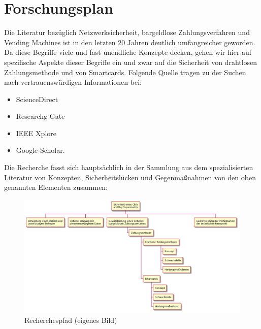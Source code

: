 \section{Forschungsplan}

Die Literatur bezüglich Netzwerksicherheit, bargeldlose Zahlungsverfahren und Vending Machines ist 
in den letzten 20 Jahren deutlich umfangreicher geworden. Da diese Begriffe viele und fast unendliche 
Konzepte decken, gehen wir hier auf spezifische Aspekte dieser Begriffe ein und zwar 
auf die Sicherheit von drahtlosen Zahlungsmethode und von Smartcards. Folgende Quelle tragen zu der
Suchen nach vertrauenswürdigen Informationen bei:

\begin{itemize}
    \item ScienceDirect
    \item Researchg Gate
    \item IEEE Xplore
    \item Google Scholar.
\end{itemize}

Die Recherche fasst sich hauptsächlich in der Sammlung aus dem spezialisierten Literatur von Konzepten,
Sicherheitslücken und Gegenmaßnahmen von den oben genannten Elementen zusammen:

\newpage
\setcounter{page}{19}
\begin{landscape}
    \begin{figure}[htb]
        \includegraphics[width=25cm]{Bilder/Diagram2.png}
        \caption{Recherchespfad (eigenes Bild)}
        \label{fig:diagramrecherche}
    \end{figure}
\end{landscape}






